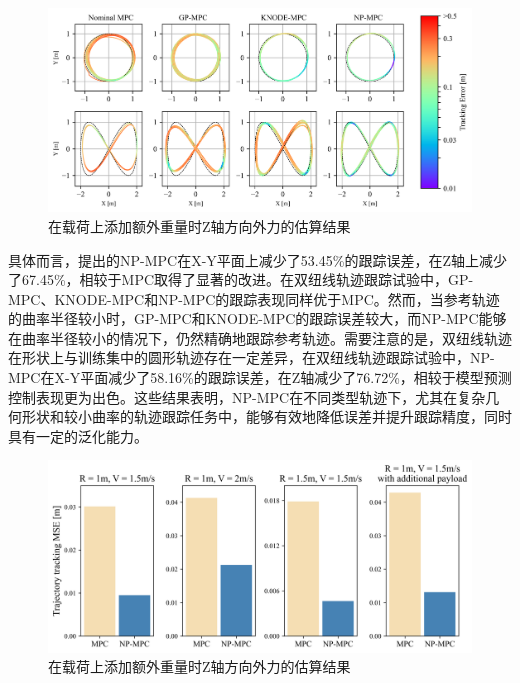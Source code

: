 \documentclass[lang=chs, degree=master, blindreview=true, winfonts=true]{yanputhesis}
\begin{document}
\begin{figure}[hbt!]
	\centering
	\includegraphics[width=38pc]{picture/kk/color.png} 
	\caption{在载荷上添加额外重量时Z轴方向外力的估算结果} 
	\label{color}
\end{figure}
具体而言，提出的NP-MPC在X-Y平面上减少了53.45\%的跟踪误差，在Z轴上减少了67.45\%，相较于MPC取得了显著的改进。在双纽线轨迹跟踪试验中，GP-MPC、KNODE-MPC和NP-MPC的跟踪表现同样优于MPC。然而，当参考轨迹的曲率半径较小时，GP-MPC和KNODE-MPC的跟踪误差较大，而NP-MPC能够在曲率半径较小的情况下，仍然精确地跟踪参考轨迹。需要注意的是，双纽线轨迹在形状上与训练集中的圆形轨迹存在一定差异，在双纽线轨迹跟踪试验中，NP-MPC在X-Y平面减少了58.16\%的跟踪误差，在Z轴减少了76.72\%，相较于模型预测控制表现更为出色。这些结果表明，NP-MPC在不同类型轨迹下，尤其在复杂几何形状和较小曲率的轨迹跟踪任务中，能够有效地降低误差并提升跟踪精度，同时具有一定的泛化能力。

\begin{figure}[hbt!]
	\centering
	\includegraphics[width=38pc]{picture/kk/prediction_res.png} 
	\caption{在载荷上添加额外重量时Z轴方向外力的估算结果} 
	\label{prediction_res}
\end{figure}
\end{document}
